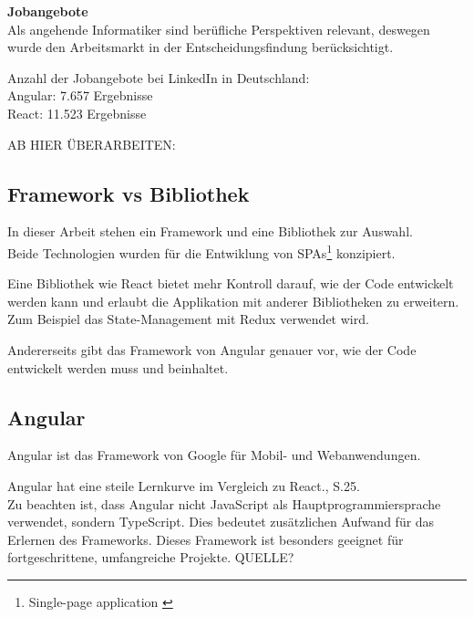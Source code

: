 \textbf{Jobangebote}\\
Als angehende Informatiker sind berüfliche Perspektiven relevant, deswegen wurde den Arbeitsmarkt in der Entscheidungsfindung berücksichtigt.

\begin{flushleft}
Anzahl der Jobangebote bei LinkedIn in Deutschland:
\\
Angular: 7.657 Ergebnisse{\cite{LI1}}
\\
React: 11.523 Ergebnisse{\cite{LI2}}
\end{flushleft}
AB HIER ÜBERARBEITEN:

\subsection{Framework vs Bibliothek}
In dieser Arbeit stehen ein Framework und eine Bibliothek zur Auswahl. 
\\
Beide Technologien wurden für die Entwiklung von SPAs\footnote{Single-page application {\cite{MO1}}} konzipiert.

Eine Bibliothek wie React bietet mehr Kontroll darauf, wie der Code entwickelt werden kann und erlaubt die Applikation mit anderer Bibliotheken zu erweitern. Zum Beispiel das State-Management mit Redux{\cite{RE1}} verwendet wird.

Andererseits gibt das Framework von Angular genauer vor, wie der Code entwickelt werden muss und beinhaltet.   

\subsection{Angular}
Angular ist das Framework von Google für Mobil- und Webanwendungen.

Angular hat eine steile Lernkurve im Vergleich zu React.{\cite{E01}}, S.25.
\\


Zu beachten ist, dass Angular nicht JavaScript als Hauptprogrammiersprache verwendet, sondern TypeScript. Dies bedeutet zusätzlichen Aufwand für das Erlernen des Frameworks. Dieses Framework ist besonders geeignet für fortgeschrittene, umfangreiche Projekte.
QUELLE?

